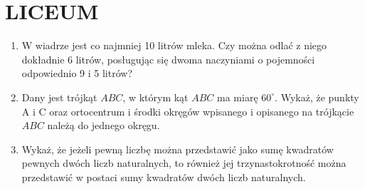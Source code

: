 \documentclass[10pt]{article}
\begin{document}
\section*{LICEUM}
\begin{enumerate}
  \item W wiadrze jest co najmniej 10 litrów mleka. Czy można odlać z niego dokładnie 6 litrów, posługując się dwoma naczyniami o pojemności odpowiednio 9 i 5 litrów?
  \item Dany jest trójkąt \(A B C\), w którym kąt \(A B C\) ma miarę \(60^{\circ}\). Wykaż, że punkty A i C oraz ortocentrum i środki okręgów wpisanego i opisanego na trójkącie \(A B C\) należą do jednego okręgu.
  \item Wykaż, że jeżeli pewną liczbę można przedstawić jako sumę kwadratów pewnych dwóch liczb naturalnych, to również jej trzynastokrotność można przedstawić w postaci sumy kwadratów dwóch liczb naturalnych.
\end{enumerate}
\end{document}
